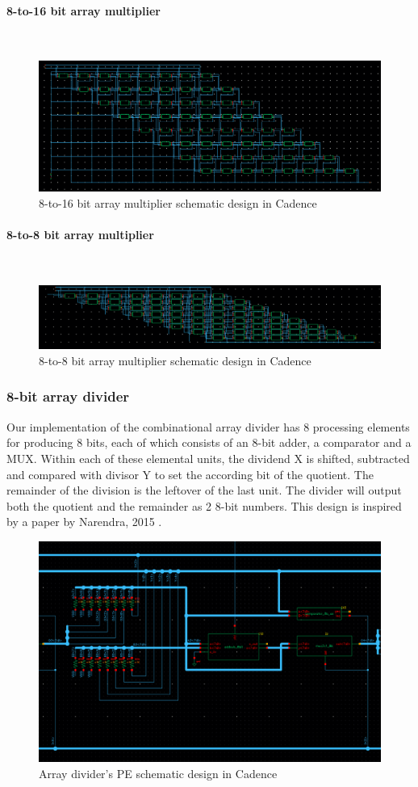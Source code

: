 \documentclass[letterpaper, 11pt]{article}
\newcommand{\subsubsubsection}[1]{\paragraph{#1}\mbox{}\\}
\begin{document}
	\newpage
	
	\subsubsubsection{8-to-16 bit array multiplier}
	
	\begin{figure}[htb!]
		\centering
		\includegraphics[width=0.85\linewidth]{report_pics/8to16_mult_schem.png}
		\caption{8-to-16 bit array multiplier schematic design in Cadence}
		\label{fig12}
	\end{figure}
	
	\subsubsubsection{8-to-8 bit array multiplier}
	
	\begin{figure}[htb!]
		\centering
		\includegraphics[width=0.85\linewidth]{report_pics/8to8_mult_schem.png}
		\caption{8-to-8 bit array multiplier schematic design in Cadence}
		\label{fig13}
	\end{figure}
	
	\subsubsection{8-bit array divider}
	Our implementation of the combinational array divider has 8 processing elements for producing 8 bits, each of which consists of an 8-bit adder, a comparator and a MUX. Within each of these elemental units, the dividend X is shifted, subtracted and compared with divisor Y to set the according bit of the quotient. The remainder of the division is the leftover of the last unit. The divider will output both the quotient and the remainder as 2 8-bit numbers. This design is inspired by a paper by Narendra, 2015 \cite{6}.
	
	\begin{figure}[htb!]
		\centering
		\includegraphics[width=0.85\linewidth]{report_pics/arr_div_pe_schem.png}
		\caption{Array divider's PE schematic design in Cadence}
		\label{fig14}
	\end{figure}
	
\end{document}
